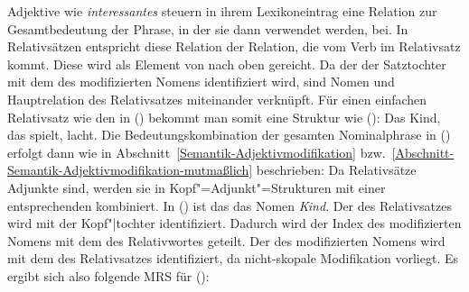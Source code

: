 Adjektive wie \emph{interessantes} steuern in ihrem Lexikoneintrag eine Relation zur Gesamtbedeutung der Phrase,
in der sie dann verwendet werden, bei. In Relativsätzen entspricht diese Relation der Relation, die
vom Verb im Relativsatz kommt. Diese wird als Element von \rels nach oben gereicht. Da der \ltopw
der Satztochter mit dem \ltopw des modifizierten Nomens identifiziert wird, sind Nomen und
Hauptrelation des Relativsatzes miteinander verknüpft. Für einen einfachen Relativsatz wie den in
() bekommt man somit eine Struktur wie ():
\ea
Das Kind, das spielt, lacht.
\z
\ea
{}
\z
Die Bedeutungskombination der gesamten Nominalphrase in () erfolgt dann wie in
Abschnitt~\ref{Semantik-Adjektivmodifikation} bzw.~\ref{Abschnitt-Semantik-Adjektivmodifikation-mutmaßlich} beschrieben: Da Relativsätze Adjunkte sind, werden sie in Kopf"=Adjunkt"=Strukturen
mit einer entsprechenden \nbar kombiniert. In () ist das das Nomen \emph{Kind}. Der \modw des Relativsatzes
wird mit der Kopf"|tochter identifiziert. Dadurch wird der Index des modifizierten Nomens mit dem
des Relativwortes geteilt. Der \ltopw des modifizierten Nomens wird mit dem des
Relativsatzes identifiziert, da nicht-skopale Modifikation vorliegt. Es ergibt sich also folgende MRS für ():

